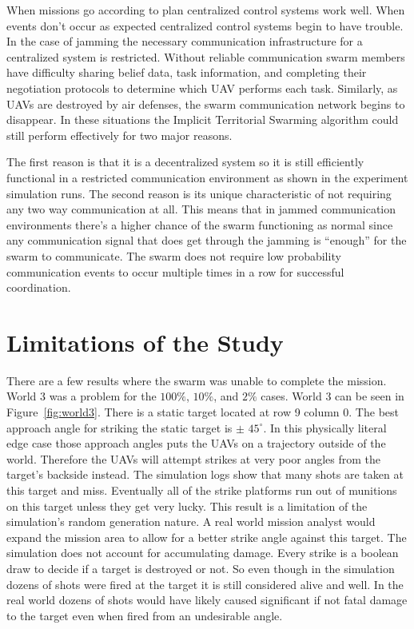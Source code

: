 \begin{multicols*}{2}
When missions go according to plan centralized control systems work well.  When events don't occur as expected centralized control systems begin to have trouble.  In the case of jamming the necessary communication infrastructure for a centralized system is restricted.  Without reliable communication swarm members have difficulty sharing belief data, task information, and completing their negotiation protocols to determine which UAV performs each task.  Similarly, as UAVs are destroyed by air defenses, the swarm communication network begins to disappear.  In these situations the Implicit Territorial Swarming algorithm could still perform effectively for two major reasons.

The first reason is that it is a decentralized system so it is still efficiently functional in a restricted communication environment as shown in the experiment simulation runs. The second reason is its unique characteristic of not requiring any two way communication at all.  This means that in jammed communication environments there's a higher chance of the swarm functioning as normal since any communication signal that does get through the jamming is ``enough'' for the swarm to communicate.  The swarm does not require low probability communication events to occur multiple times in a row for successful coordination.


\section{Limitations of the Study}
There are a few results where the swarm was unable to complete the mission.  World 3 was a problem for the $100\%$, $10\%$, and $2\%$ cases.  World 3 can be seen in Figure~\ref{fig:world3}.  There is a static target located at row 9 column 0.  The best approach angle for striking the static target is $\pm$ $45^{\circ}$.  In this physically literal edge case those approach angles puts the UAVs on a trajectory outside of the world.  Therefore the UAVs will attempt strikes at very poor angles from the target's backside instead.  The simulation logs show that many shots are taken at this target and miss.  Eventually all of the strike platforms run out of munitions on this target unless they get very lucky.  This result is a limitation of the simulation's random generation nature.  A real world mission analyst would expand the mission area to allow for a better strike angle against this target.  The simulation does not account for accumulating damage.  Every strike is a boolean draw to decide if a target is destroyed or not.  So even though in the simulation dozens of shots were fired at the target it is still considered alive and well.  In the real world dozens of shots would have likely caused significant if not fatal damage to the target even when fired from an undesirable angle.


\end{multicols*}
